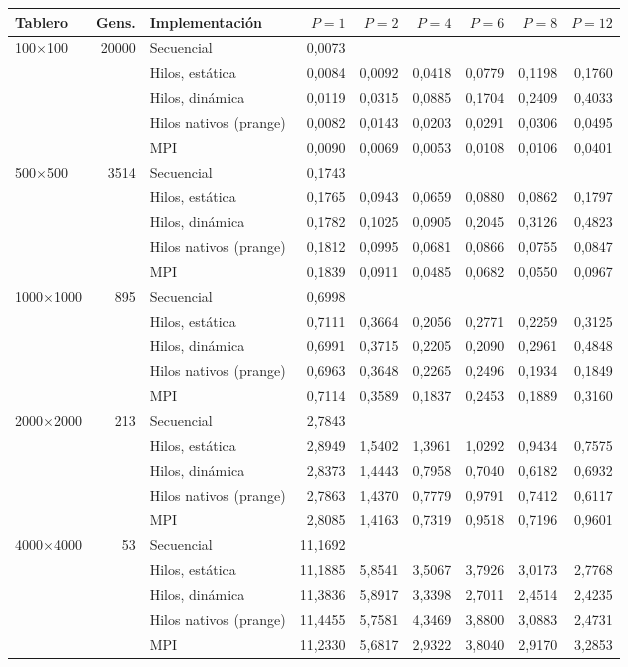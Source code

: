 \begin{tabular}{lrlrrrrrr}
\toprule
Tablero & Gens. & Implementación & $P=1$ & $P=2$ & $P=4$ & $P=6$ & $P=8$ & $P=12$ \\
\midrule
100$\times$100 & 20000 & Secuencial & 0,0073 &  &  &  &  &  \\
 & & Hilos, estática & 0,0084 & 0,0092 & 0,0418 & 0,0779 & 0,1198 & 0,1760 \\
 & & Hilos, dinámica & 0,0119 & 0,0315 & 0,0885 & 0,1704 & 0,2409 & 0,4033 \\
 & & Hilos nativos (prange) & 0,0082 & 0,0143 & 0,0203 & 0,0291 & 0,0306 & 0,0495 \\
 & & MPI & 0,0090 & 0,0069 & 0,0053 & 0,0108 & 0,0106 & 0,0401 \\
\midrule
500$\times$500 & 3514 & Secuencial & 0,1743 &  &  &  &  &  \\
 & & Hilos, estática & 0,1765 & 0,0943 & 0,0659 & 0,0880 & 0,0862 & 0,1797 \\
 & & Hilos, dinámica & 0,1782 & 0,1025 & 0,0905 & 0,2045 & 0,3126 & 0,4823 \\
 & & Hilos nativos (prange) & 0,1812 & 0,0995 & 0,0681 & 0,0866 & 0,0755 & 0,0847 \\
 & & MPI & 0,1839 & 0,0911 & 0,0485 & 0,0682 & 0,0550 & 0,0967 \\
\midrule
1000$\times$1000 & 895 & Secuencial & 0,6998 &  &  &  &  &  \\
 & & Hilos, estática & 0,7111 & 0,3664 & 0,2056 & 0,2771 & 0,2259 & 0,3125 \\
 & & Hilos, dinámica & 0,6991 & 0,3715 & 0,2205 & 0,2090 & 0,2961 & 0,4848 \\
 & & Hilos nativos (prange) & 0,6963 & 0,3648 & 0,2265 & 0,2496 & 0,1934 & 0,1849 \\
 & & MPI & 0,7114 & 0,3589 & 0,1837 & 0,2453 & 0,1889 & 0,3160 \\
\midrule
2000$\times$2000 & 213 & Secuencial & 2,7843 &  &  &  &  &  \\
 & & Hilos, estática & 2,8949 & 1,5402 & 1,3961 & 1,0292 & 0,9434 & 0,7575 \\
 & & Hilos, dinámica & 2,8373 & 1,4443 & 0,7958 & 0,7040 & 0,6182 & 0,6932 \\
 & & Hilos nativos (prange) & 2,7863 & 1,4370 & 0,7779 & 0,9791 & 0,7412 & 0,6117 \\
 & & MPI & 2,8085 & 1,4163 & 0,7319 & 0,9518 & 0,7196 & 0,9601 \\
\midrule
4000$\times$4000 & 53 & Secuencial & 11,1692 &  &  &  &  &  \\
 & & Hilos, estática & 11,1885 & 5,8541 & 3,5067 & 3,7926 & 3,0173 & 2,7768 \\
 & & Hilos, dinámica & 11,3836 & 5,8917 & 3,3398 & 2,7011 & 2,4514 & 2,4235 \\
 & & Hilos nativos (prange) & 11,4455 & 5,7581 & 4,3469 & 3,8800 & 3,0883 & 2,4731 \\
 & & MPI & 11,2330 & 5,6817 & 2,9322 & 3,8040 & 2,9170 & 3,2853 \\
\bottomrule
\end{tabular}
